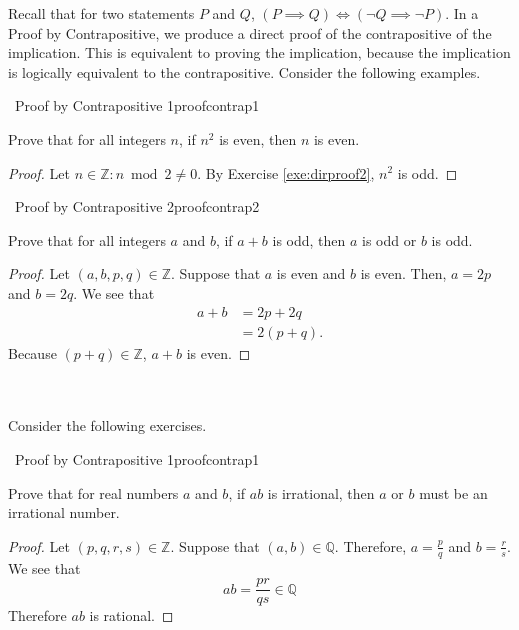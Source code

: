         Recall that for two statements \(P\) and \(Q\), \((P\implies Q)\iff(\neg Q\implies \neg P)\). In a Proof by Contrapositive, we produce a direct proof of the contrapositive of the implication. This is equivalent to proving the implication, because the implication is logically equivalent to the contrapositive. Consider the following examples.
        \begin{example}{\Difficulty\,\Difficulty\,\,Proof by Contrapositive 1}{proofcontrap1}
        
        Prove that for all integers \(n\), if \(n^2\) is even, then \(n\) is even.
        
        \begin{proof}
            Let \(n\in\mathbb{Z}:n\bmod2\neq0\). By Exercise \ref{exe:dirproof2}, \(n^2\) is odd.
        \end{proof}
        
        \end{example}
        \begin{example}{\Difficulty\,\Difficulty\,\,Proof by Contrapositive 2}{proofcontrap2}
        
        Prove that for all integers \(a\) and \(b\), if \(a+b\) is odd, then \(a\) is odd or \(b\) is odd.
       
        \begin{proof}
            Let \((a, b,p,q)\in\mathbb{Z}\). Suppose that \(a\) is even and \(b\) is even. Then, \(a=2p\) and \(b=2q\). We see that
            \begin{align*}
                a+b&=2p+2q \\
                &=2(p+q).
            \end{align*}
            Because \((p+q)\in\mathbb{Z}\), \(a+b\) is even.
        \end{proof}
        
        \end{example}
        \vphantom
        \\
        \\
        Consider the following exercises.
        \begin{exercise}{\Difficulty\,\Difficulty\,\,Proof by Contrapositive 1}{proofcontrap1}
        
        Prove that for real numbers \(a\) and \(b\), if \(ab\) is irrational, then \(a\) or \(b\) must be an irrational number.
        
        \begin{proof}
            Let \((p,q,r,s)\in\mathbb{Z}\). Suppose that \((a,b)\in\mathbb{Q}\). Therefore, \(a=\frac{p}{q}\) and \(b=\frac{r}{s}\). We see that
            \begin{equation*}
                ab=\frac{pr}{qs}\in\mathbb{Q}
            \end{equation*}
            Therefore \(ab\) is rational.
        \end{proof}
        
        \end{exercise}
